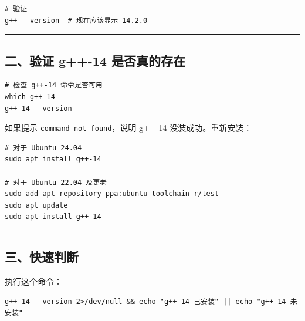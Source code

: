 \documentclass[11pt, a4paper]{article}
\begin{document}
\begin{aibox}
\begin{tcolorbox}[colback=white,colframe=gray!50!white,boxrule=0.5pt,arc=2pt,left=5pt,right=5pt,top=5pt,bottom=5pt]
\begin{verbatim}
# 验证
g++ --version  # 现在应该显示 14.2.0
\end{verbatim}
\end{tcolorbox}

\begin{center}\rule{\textwidth}{0.4pt}\end{center}

\subsection*{二、验证 g++-14 是否真的存在}

\begin{tcolorbox}[colback=white,colframe=gray!50!white,boxrule=0.5pt,arc=2pt,left=5pt,right=5pt,top=5pt,bottom=5pt]
\begin{verbatim}
# 检查 g++-14 命令是否可用
which g++-14
g++-14 --version
\end{verbatim}
\end{tcolorbox}

如果提示 \texttt{command not found}，说明 g++-14 没装成功。重新安装：

\begin{tcolorbox}[colback=white,colframe=gray!50!white,boxrule=0.5pt,arc=2pt,left=5pt,right=5pt,top=5pt,bottom=5pt]
\begin{verbatim}
# 对于 Ubuntu 24.04
sudo apt install g++-14

# 对于 Ubuntu 22.04 及更老
sudo add-apt-repository ppa:ubuntu-toolchain-r/test
sudo apt update
sudo apt install g++-14
\end{verbatim}
\end{tcolorbox}

\begin{center}\rule{\textwidth}{0.4pt}\end{center}

\subsection*{三、快速判断}

执行这个命令：

\begin{tcolorbox}[colback=white,colframe=gray!50!white,boxrule=0.5pt,arc=2pt,left=5pt,right=5pt,top=5pt,bottom=5pt]
\begin{verbatim}
g++-14 --version 2>/dev/null && echo "g++-14 已安装" || echo "g++-14 未安装"
\end{verbatim}
\end{tcolorbox}


\end{aibox}
\end{document}
